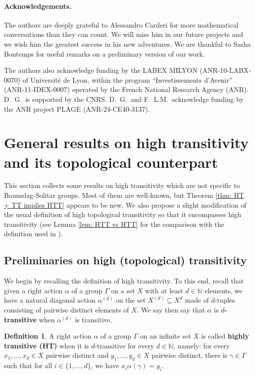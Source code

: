 \documentclass[12pt]{article}
\numberwithin{equation}{section}
\theoremstyle{definition}
\newtheorem{definition}[equation]{Definition}
\def\defin#1{\textbf{#1}}
\newcommand{\N}{\mathbb{N}}
\begin{document}
\paragraph{Acknowledgements.} 
    The authors are deeply grateful to Alessandro
    Carderi for more mathematical conversations
    than they can count. We will miss him in our future projects and we wish him the greatest success in his new adventures.
    We are thankful to Sasha Bontemps for useful remarks on a preliminary version
    of our work.
   
    The authors also acknowledge funding by the LABEX MILYON (ANR-10-LABX-0070) of Université de Lyon, within the program “Investissements d’Avenir” (ANR-11-IDEX-0007) operated by the French National Research Agency (ANR).
	D.~G.\ is supported by the CNRS.
	D.~G.\ and F.~L.M.\ acknowledge funding by the ANR project PLAGE (ANR-24-CE40-3137).



\section{General results on high transitivity and its topological counterpart}

This section collects some results on high transitivity
which are not specific to Baumslag-Solitar groups. 
Most of them are well-known, but Theorem \ref{thm: HT + TT implies HTT}
appears to be new. 
We also propose a slight modification of the usual definition of high topological transitivity 
so that it encompasses high transitivity (see Lemma \ref{lem: HTT vs HTT} for the comparison
with the definition used in \cite{azuelosPerfectKernelDynamics2023}).

\subsection{Preliminaries on high (topological) transitivity}

We begin by recalling the definition of high transitivity.
To this end, recall that given a right action \( \alpha \) of a group \( \Gamma \)
on a set \(X\) with at least \(d\in\N\) elements, we have a natural diagonal action \(\alpha^{(d)}\)
on the set \(X^{(d)}\subseteq X^d\) 
made of \(d\)-tuples consisting of pairwise distinct elements of \(X\).
We say then say that \( \alpha \) is \(d\)\defin{-transitive} when \(\alpha^{(d)}\) is transitive. 

\begin{definition}\label{def: HT}
	A right action \( \alpha \) of a group \( \Gamma \) on an infinite set \(X\) is called
	\defin{highly transitive (HT)} when it is \(d\)-transitive for every \(d\in\N\), namely:
	for every \(x_1,\dots,x_d\in X\) pairwise distinct and 
	\(y_1,\dots,y_d\in X\) pairwise distinct, there is \(\gamma\in\Gamma\) such that for 
	all \( i\in\{1,\dots,d\} \), we have \(x_i\alpha(\gamma)=y_i\).
\end{definition}
\end{document}
